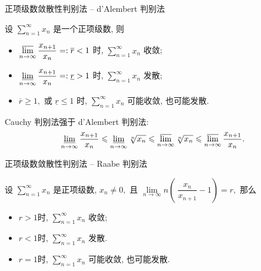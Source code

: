 \begin{frame}{正项级数敛散性判别法 -- d'Alembert 判别法}

\begin{thm}
设 $\sum\limits_{n=1}^{\infty} x_n$ 是一个正项级数, 则
\begin{itemize}
\item $\varlimsup\limits_{n\to\infty} \dfrac{x_{n+1}}{x_n} =: \overline{r} < 1$ 时, $\sum\limits_{n=1}^{\infty} x_n$ 收敛;
\item $\varliminf\limits_{n\to\infty} \dfrac{x_{n+1}}{x_n} =: \underline{r} > 1$ 时, $\sum\limits_{n=1}^{\infty} x_n$ 发散;
\item $\overline{r} \geqslant 1,$ 或 $\underline{r} \leqslant 1$ 时, $\sum\limits_{n=1}^{\infty} x_n$ 可能收敛, 也可能发散.
\end{itemize}
\end{thm}

\pause

\begin{attnblock}
Cauchy 判别法强于 d'Alembert 判别法:
\vspace{-0.6em}
\[\varliminf\limits_{n\to\infty} \dfrac{x_{n+1}}{x_n} \leqslant \varliminf\limits_{n\to\infty} \sqrt[n]{x_n} \leqslant \varlimsup\limits_{n\to\infty} \sqrt[n]{x_n} \leqslant \varlimsup\limits_{n\to\infty} \dfrac{x_{n+1}}{x_n}.\]
\end{attnblock}

\end{frame}


\begin{frame}{正项级数敛散性判别法 -- Raabe 判别法}

\begin{thm}
设 $\sum\limits_{n=1}^\infty x_n$ 是正项级数, $x_n \neq 0,$ 且 $\lim\limits_{n\to\infty} n \left( ~ \dfrac{x_n}{x_{n+1}} - 1 \right) = r,$ 那么
\begin{itemize}
\item $r > 1$时, $\sum\limits_{n=1}^\infty x_n$ 收敛;
\item $r < 1$时, $\sum\limits_{n=1}^\infty x_n$ 发散.
\item $r = 1$时, $\sum\limits_{n=1}^\infty x_n$ 可能收敛, 也可能发散.
\end{itemize}
\end{thm}

\end{frame}

